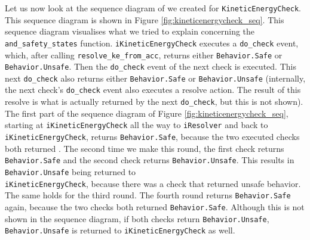 \documentclass[12pt]{scrreprt}
\begin{document}
Let us now look at the sequence diagram of we created for \texttt{KineticEnergyCheck}. This sequence diagram is shown in Figure \ref{fig:kineticenergycheck_seq}. This sequence diagram visualises what we tried to explain concerning the \texttt{and\_safety\_states} function. \texttt{iKineticEnergyCheck} executes a \texttt{do\_check} event, which, after calling \texttt{resolve\_ke\_from\_acc}, returns either \texttt{Behavior.Safe} or \texttt{Behavior.Unsafe}. Then the \texttt{do\_check} event of the next check is executed. This next \texttt{do\_check} also returns either \texttt{Behavior.Safe} or \texttt{Behavior.Unsafe} (internally, the next check's \texttt{do\_check} event also executes a resolve action. The result of this resolve is what is actually returned by the next \texttt{do\_check}, but this is not shown). The first part of the sequence diagram of Figure \ref{fig:kineticenergycheck_seq}, starting at \texttt{iKineticEnergyCheck} all the way to \texttt{iResolver} and back to \texttt{iKineticEnergyCheck}, returns \texttt{Behavior.Safe}, because the two executed checks both returned . The second time we make this round, the first check returns \texttt{Behavior.Safe} and the second check returns \texttt{Behavior.Unsafe}. This results in \texttt{Behavior.Unsafe} being returned to\\\texttt{iKineticEnergyCheck}, because there was a check that returned unsafe behavior. The same holds for the third round. The fourth round returns \texttt{Behavior.Safe} again, because the two checks both returned \texttt{Behavior.Safe}. Although this is not shown in the sequence diagram, if both checks return \texttt{Behavior.Unsafe}, \texttt{Behavior.Unsafe} is returned to \texttt{iKineticEnergyCheck} as well.
\end{document}
